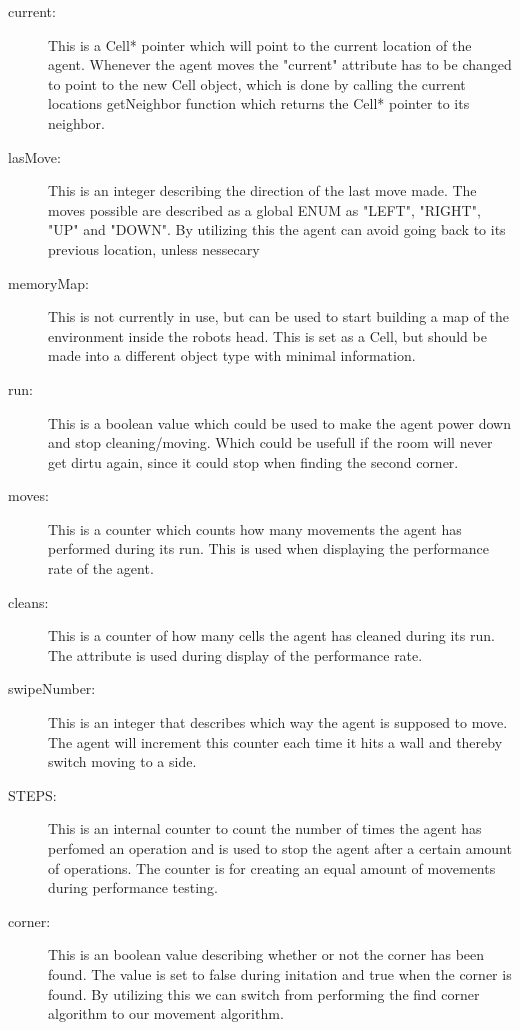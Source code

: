 \begin{description}
\item[current:]
	This is a Cell* pointer which will point to the current location of the agent.
	Whenever the agent moves the "current" attribute has to be changed to point to
	the new Cell object, which is done by calling the current locations getNeighbor
	function which returns the Cell* pointer to its neighbor.
\item[lasMove:]
	This is an integer describing the direction of the last move made. The moves
	possible are described as a global ENUM as "LEFT", "RIGHT", "UP" and "DOWN".
	By utilizing this the agent can avoid going back to its previous location,
	unless nessecary
\item[memoryMap:]
	This is not currently in use, but can be used to start building a map of the
	environment inside the robots head.  This is set as a Cell, but should be made
	into a different object type with minimal information.
\item[run:]
	This is a boolean value which could  be used to make the agent power down and
	stop cleaning/moving.  Which could be usefull if the room will never get dirtu
	again, since it could stop when finding the second corner.
\item[moves:]
	This is a counter which counts how many movements the agent has performed
	during its run.  This is used when displaying the performance rate of the
	agent.
\item[cleans:]
	This is a counter of how many cells the agent has cleaned during its run. The
	attribute is used during display of the performance rate.
\item[swipeNumber:]
	This is an integer that describes which way the agent is supposed to move.
	The agent will increment this counter each time it hits a wall and thereby
	switch moving to a side. 
\item[STEPS:]
	This is an internal counter to count the number of times the agent has
	perfomed an operation and is used to stop the agent after a certain amount of
	operations.  The counter is for creating an equal amount of movements during
	performance testing.
\item[corner:]
	This is an boolean value describing whether or not the corner has been found.
	The value is set to false during initation and true when the corner is found.
	By utilizing this we can switch from performing the find  corner algorithm to
	our movement algorithm.
\end{description}

